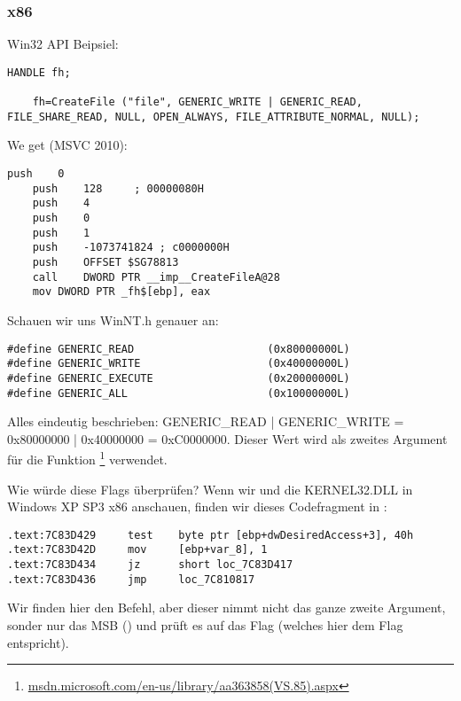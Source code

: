 \subsubsection{x86}

Win32 API Beipsiel:

\begin{lstlisting}[style=customc]
	HANDLE fh;

	fh=CreateFile ("file", GENERIC_WRITE | GENERIC_READ, FILE_SHARE_READ, NULL, OPEN_ALWAYS, FILE_ATTRIBUTE_NORMAL, NULL);
\end{lstlisting}

We get (MSVC 2010):

\begin{lstlisting}[caption=MSVC 2010,style=customasmx86]
	push	0
	push	128		; 00000080H
	push	4
	push	0
	push	1
	push	-1073741824	; c0000000H
	push	OFFSET $SG78813
	call	DWORD PTR __imp__CreateFileA@28
	mov	DWORD PTR _fh$[ebp], eax
\end{lstlisting}

Schauen wir uns WinNT.h genauer an:

\begin{lstlisting}[caption=WinNT.h,style=customc]
#define GENERIC_READ                     (0x80000000L)
#define GENERIC_WRITE                    (0x40000000L)
#define GENERIC_EXECUTE                  (0x20000000L)
#define GENERIC_ALL                      (0x10000000L)
\end{lstlisting}
Alles eindeutig beschrieben: GENERIC\_READ | GENERIC\_WRITE = 0x80000000 |
0x40000000 = 0xC0000000. Dieser Wert wird als zweites Argument für die Funktion
\footnote{\href{http://go.yurichev.com/17065}{msdn.microsoft.com/en-us/library/aa363858(VS.85).aspx}}
verwendet.

Wie würde  diese Flags überprüfen?
Wenn wir und die KERNEL32.DLL in Windows XP SP3 x86 anschauen, finden wir dieses
Codefragment in :

\begin{lstlisting}[caption=KERNEL32.DLL (Windows XP SP3 x86),style=customasmx86]
.text:7C83D429     test    byte ptr [ebp+dwDesiredAccess+3], 40h
.text:7C83D42D     mov     [ebp+var_8], 1
.text:7C83D434     jz      short loc_7C83D417
.text:7C83D436     jmp     loc_7C810817
\end{lstlisting}

Wir finden hier den \TEST Befehl, aber dieser nimmt nicht das ganze zweite
Argument, sonder nur das MSB () und prüft es auf das
Flag  (welches hier dem  Flag entspricht).

